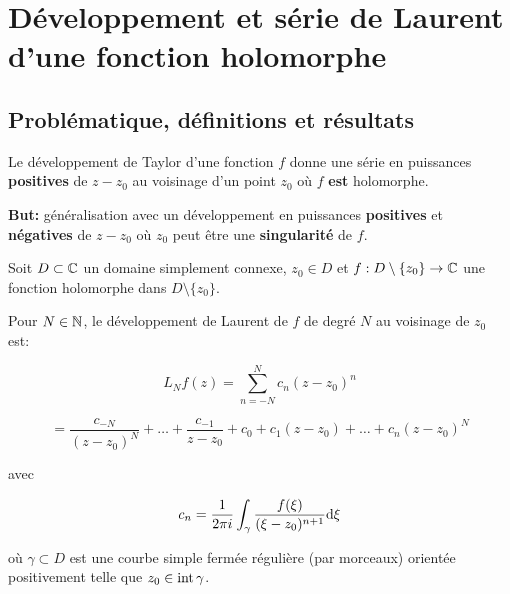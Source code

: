 \section{Développement et série de Laurent d'une fonction holomorphe}

\subsection{Problématique, définitions et résultats}


\begin{motivation}\hfill
    
    Le développement de Taylor d'une fonction $f$ donne une série en puissances \textbf{positives} de $z - z_0$ au voisinage d'un point $z_0$ où $f$ \textbf{est} holomorphe.
    
    \textbf{But:} généralisation avec un développement en puissances \textbf{positives} et \textbf{négatives} de $z - z_0$ où $z_0$ peut être une \textbf{singularité} de $f$.
\end{motivation}


\begin{hypothesis}\hfill
    
    Soit $D \subset \mathbb{C}$ un domaine simplement connexe, $z_0 \in D$ et $f: D \setminus \{z_0\} \rightarrow \mathbb{C}$ une fonction holomorphe dans $D \setminus \{z_0\}$.
\end{hypothesis}

\begin{definition}
    Pour $N \in \mathbb{N}$, le développement de Laurent de $f$ de degré $N$ au voisinage de $z_0$ est:
    
    \[ L_N f(z) = \sum_{n = -N}^{N} c_n (z - z_0)^n \]
    
    \[ = \frac{c_ {-N}}{(z - z_0)^N} + \ldots + \frac{c_ {-1}}{z - z_0} + c_0 + c_1 (z - z_0) + \ldots + c_n (z - z_0)^N \]
    
    avec
    
    \[ c_n = \frac{1}{2 \pi i} \int_\gamma \frac{f(\xi)}{(\xi - z_0)^{n + 1}} \mathrm{d}\xi \]
    
    où $\gamma \subset D$ est une courbe simple fermée régulière (par morceaux) orientée positivement telle que $z_0 \in \textrm{int}\, \gamma$.
\end{definition}

